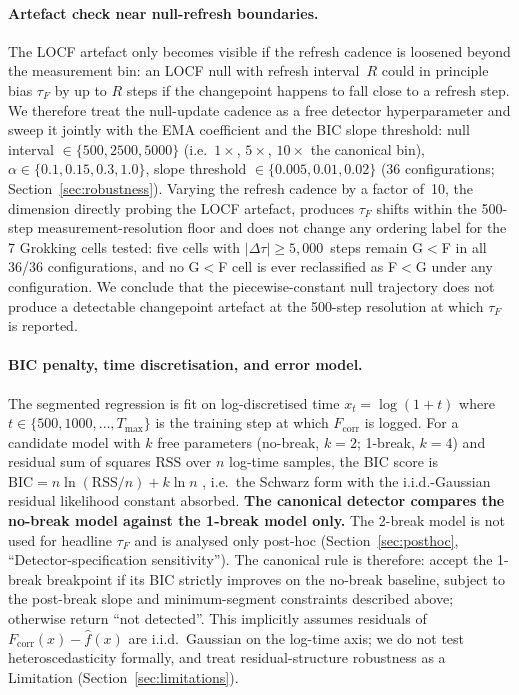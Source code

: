 \documentclass{article}
\newcommand{\tauf}{\tau_{F}}
\newcommand{\Dtau}{\Delta\tau}
\newcommand{\fcorr}{F_{\mathrm{corr}}}
\begin{document}
\paragraph{Artefact check near null-refresh boundaries.}
The LOCF artefact only becomes visible if the refresh cadence is
loosened beyond the measurement bin: an LOCF null with refresh
interval~$R$ could in principle bias $\tauf$ by up to $R$ steps if
the changepoint happens to fall close to a refresh step.
We therefore treat the null-update cadence as a free detector
hyperparameter and sweep it jointly with the EMA coefficient and the
BIC slope threshold: null interval $\in\{500, 2500, 5000\}$ (i.e.\
$1\times$, $5\times$, $10\times$ the canonical bin),
$\alpha\in\{0.1, 0.15, 0.3, 1.0\}$,
slope threshold $\in\{0.005, 0.01, 0.02\}$
(36 configurations; Section~\ref{sec:robustness}).
Varying the refresh cadence by a factor of~10, the dimension
directly probing the LOCF artefact, produces $\tauf$ shifts within
the 500-step measurement-resolution floor and does not change any
ordering label for the 7 Grokking cells tested:
five cells with $|\Dtau|\geq5{,}000$~steps remain G$<$F in all
36/36 configurations, and no G$<$F cell is ever reclassified as F$<$G
under any configuration.
We conclude that the piecewise-constant null trajectory does not
produce a detectable changepoint artefact at the 500-step resolution
at which $\tauf$ is reported.

\paragraph{BIC penalty, time discretisation, and error model.}
The segmented regression is fit on log-discretised time
$x_t=\log(1+t)$ where $t\in\{500,1000,\dots,T_{\max}\}$ is the
training step at which $\fcorr$ is logged.
For a candidate model with $k$ free parameters (no-break,
$k{=}2$; 1-break, $k{=}4$) and residual sum of squares
$\mathrm{RSS}$ over $n$ log-time samples, the BIC score is
$\mathrm{BIC}=n\ln(\mathrm{RSS}/n)+k\ln n$ \citep{schwarz1978estimating},
i.e.\ the Schwarz form with the i.i.d.-Gaussian residual likelihood
constant absorbed.
\textbf{The canonical detector compares the no-break model
against the 1-break model only.}
The 2-break model is not used for headline $\tauf$ and is
analysed only post-hoc
(Section~\ref{sec:posthoc}, ``Detector-specification sensitivity'').
The canonical rule is therefore: accept the 1-break breakpoint if
its BIC strictly improves on the no-break baseline, subject to the
post-break slope and minimum-segment constraints described above;
otherwise return ``not detected''.
This implicitly assumes residuals of $\fcorr(x)-\hat f(x)$ are
i.i.d.\ Gaussian on the log-time axis; we do not test
heteroscedasticity formally, and treat residual-structure
robustness as a Limitation
(Section~\ref{sec:limitations}).
\end{document}
